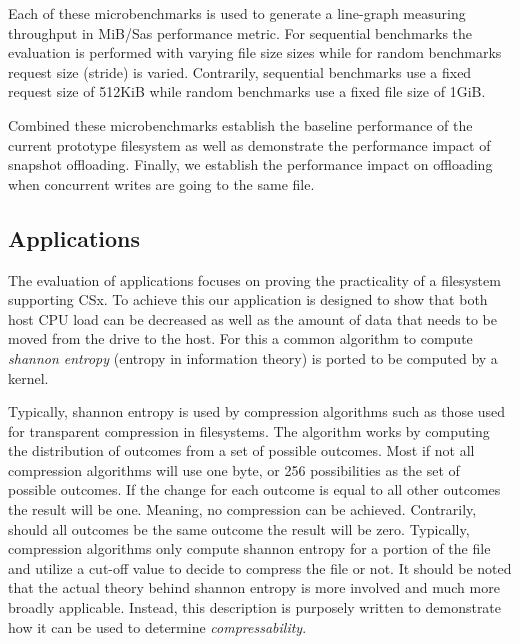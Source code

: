 Each of these microbenchmarks is used to generate a line-graph measuring
throughput in MiB/S\footnotemark[16] as performance metric. For sequential
benchmarks the evaluation is performed with varying file size sizes while for
random benchmarks request size (stride) is varied. Contrarily, sequential
benchmarks use a fixed request size of 512KiB while random benchmarks use a
fixed file size of 1GiB.


Combined these microbenchmarks establish the baseline performance of the current
prototype filesystem as well as demonstrate the performance impact of
snapshot offloading. Finally, we establish the performance impact on
offloading when concurrent writes are going to the same file.

\subsection{Applications}

The evaluation of applications focuses on proving the practicality of a
filesystem supporting CSx. To achieve this our application is designed to show
that both host CPU load can be decreased as well as the amount of data that
needs to be moved from the drive to the host. For this a common algorithm to
compute \textit{shannon entropy} (entropy in information theory) \cite{6773024}
is ported to be computed by a kernel.

Typically, shannon entropy is used by compression algorithms such as those used
for transparent compression in filesystems. The algorithm works by computing
the distribution of outcomes from a set of possible outcomes. Most if not all
compression algorithms will use one byte, or 256 possibilities as the set of
possible outcomes. If the change for each outcome is equal to all other
outcomes the result will be one\footnotemark[17]. Meaning, no compression can be
achieved. Contrarily, should all outcomes be the same outcome the result will
be zero. Typically, compression algorithms only compute shannon entropy for a
portion of the file and utilize a cut-off value to decide to compress the file
or not. It should be noted that the actual theory behind shannon entropy is more
involved and much more broadly applicable. Instead, this description is
purposely written to demonstrate how it can be used to determine
\textit{compressability}.


